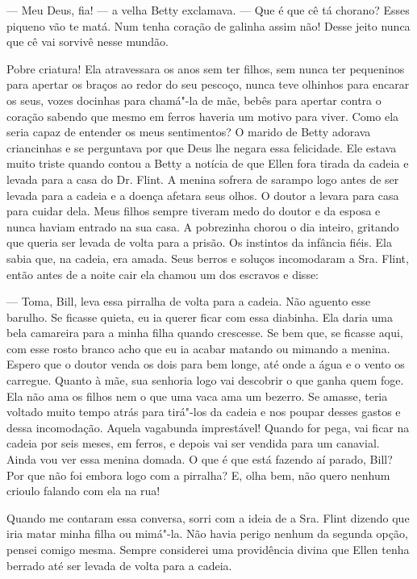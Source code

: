 --- Meu Deus, fia! --- a velha Betty exclamava. --- Que é que cê tá
chorano? Esses piqueno vão te matá. Num tenha coração de galinha assim
não! Desse jeito nunca que cê vai sorvivê nesse mundão.

Pobre criatura! Ela atravessara os anos
sem ter filhos, sem nunca ter pequeninos para apertar os braços ao redor
do seu pescoço, nunca teve olhinhos para encarar os seus, vozes docinhas
para chamá"-la de mãe, bebês para apertar contra o coração sabendo que
mesmo em ferros haveria um motivo para viver. Como ela seria capaz de
entender os meus sentimentos? O marido de Betty adorava criancinhas e se
perguntava por que Deus lhe negara essa felicidade. Ele estava muito
triste quando contou a Betty a notícia de que Ellen fora tirada da
cadeia e levada para a casa do Dr. Flint. A menina sofrera de sarampo
logo antes de ser levada para a cadeia e a doença afetara seus olhos. O
doutor a levara para casa para cuidar dela. Meus filhos sempre tiveram
medo do doutor e da esposa e nunca haviam entrado na sua casa. A
pobrezinha chorou o dia inteiro, gritando que queria ser levada de volta
para a prisão. Os instintos da infância fiéis. Ela sabia que, na cadeia,
era amada. Seus berros e soluços incomodaram a Sra. Flint, então antes
de a noite cair ela chamou um dos escravos e disse:

--- Toma, Bill, leva essa pirralha de volta para a cadeia. Não aguento
esse barulho. Se ficasse quieta, eu ia querer ficar com essa diabinha.
Ela daria uma bela camareira para a minha filha quando crescesse. Se bem
que, se ficasse aqui, com esse rosto branco acho que eu ia acabar
matando ou mimando a menina. Espero que o doutor venda os dois para bem
longe, até onde a água e o vento os carregue. Quanto à mãe, sua senhoria
logo vai descobrir o que ganha quem foge. Ela não ama os filhos nem o
que uma vaca ama um bezerro. Se amasse, teria voltado muito tempo atrás
para tirá"-los da cadeia e nos poupar desses gastos e dessa incomodação.
Aquela vagabunda imprestável! Quando for pega, vai ficar na cadeia por
seis meses, em ferros, e depois vai ser vendida para um canavial. Ainda
vou ver essa menina domada. O que é que está fazendo aí parado, Bill?
Por que não foi embora logo com a pirralha? E, olha bem, não quero
nenhum crioulo falando com ela na rua!

Quando me contaram essa conversa, sorri
com a ideia de a Sra. Flint dizendo que iria matar minha filha ou
mimá"-la. Não havia perigo nenhum da segunda opção, pensei comigo mesma.
Sempre considerei uma providência divina que Ellen tenha berrado até ser
levada de volta para a cadeia.

